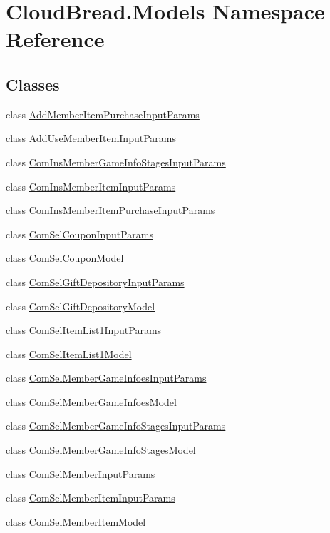 \hypertarget{a00221}{}\section{Cloud\+Bread.\+Models Namespace Reference}
\label{a00221}
\subsection*{Classes}
\begin{DoxyCompactItemize}
\item 
class \hyperlink{a00004}{Add\+Member\+Item\+Purchase\+Input\+Params}
\item 
class \hyperlink{a00005}{Add\+Use\+Member\+Item\+Input\+Params}
\item 
class \hyperlink{a00049}{Com\+Ins\+Member\+Game\+Info\+Stages\+Input\+Params}
\item 
class \hyperlink{a00050}{Com\+Ins\+Member\+Item\+Input\+Params}
\item 
class \hyperlink{a00051}{Com\+Ins\+Member\+Item\+Purchase\+Input\+Params}
\item 
class \hyperlink{a00052}{Com\+Sel\+Coupon\+Input\+Params}
\item 
class \hyperlink{a00053}{Com\+Sel\+Coupon\+Model}
\item 
class \hyperlink{a00054}{Com\+Sel\+Gift\+Depository\+Input\+Params}
\item 
class \hyperlink{a00055}{Com\+Sel\+Gift\+Depository\+Model}
\item 
class \hyperlink{a00056}{Com\+Sel\+Item\+List1\+Input\+Params}
\item 
class \hyperlink{a00057}{Com\+Sel\+Item\+List1\+Model}
\item 
class \hyperlink{a00058}{Com\+Sel\+Member\+Game\+Infoes\+Input\+Params}
\item 
class \hyperlink{a00059}{Com\+Sel\+Member\+Game\+Infoes\+Model}
\item 
class \hyperlink{a00060}{Com\+Sel\+Member\+Game\+Info\+Stages\+Input\+Params}
\item 
class \hyperlink{a00061}{Com\+Sel\+Member\+Game\+Info\+Stages\+Model}
\item 
class \hyperlink{a00062}{Com\+Sel\+Member\+Input\+Params}
\item 
class \hyperlink{a00063}{Com\+Sel\+Member\+Item\+Input\+Params}
\item 
class \hyperlink{a00064}{Com\+Sel\+Member\+Item\+Model}
\item 

\end{DoxyCompactItemize}
